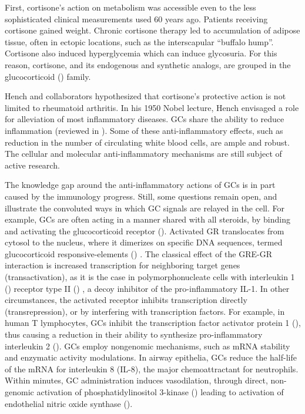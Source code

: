 \documentclass[12pt,english]{report}\usepackage[]{graphicx}\usepackage[]{color}
\begin{document}
First, cortisone's action on metabolism was accessible even to the
less sophisticated clinical measurements used 60 years ago. Patients
receiving cortisone gained weight. Chronic cortisone therapy led to
accumulation of adipose tissue, often in ectopic locations, such as
the interscapular ``buffalo hump''. Cortisone also induced hyperglycemia
which can induce glycosuria. For this reason, cortisone, and its endogenous
and synthetic analogs, are grouped in the glucocorticoid ()
family.

Hench and collaborators hypothesized that cortisone's protective action
is not limited to rheumatoid arthritis. In his 1950 Nobel lecture,
Hench envisaged a role for alleviation of most inflammatory diseases.
GCs share the ability to reduce inflammation (reviewed in \citep{clark2007anti-inflammatory,coutinho2011anti-inflammatory}).
Some of these anti-inflammatory effects, such as reduction in the
number of circulating white blood cells, are ample and robust. The
cellular and molecular anti-inflammatory mechanisms are still subject
of active research.

The knowledge gap around the anti-inflammatory actions of GCs is in
part caused by the immunology progress. Still, some questions remain
open, and illustrate the convoluted ways in which GC signals are relayed
in the cell. For example, GCs are often acting in a manner shared
with all steroids, by binding and activating the glucocorticoid receptor
(). Activated GR translocates
from cytosol to the nucleus, where it dimerizes on specific DNA sequences,
termed glucocorticoid responsive-elements ()
\citep{truss1990contacts}. The classical effect of the GRE-GR interaction
is increased transcription for neighboring target genes (transactivation),
as it is the case in polymorphonucleate cells with interleukin 1 ()
receptor type II ()
\citep{re1994type}, a decoy inhibitor of the pro-inflammatory IL-1.
In other circumstances, the activated receptor inhibits transcription
directly (transrepression), or by interfering with transcription factors.
For example, in human T lymphocytes, GCs inhibit the transcription
factor activator protein 1 (),
thus causing a reduction in their ability to synthesize pro-inflammatory
interleukin 2 ()\citep{paliogianni1993negative}.
GCs employ nongenomic mechanisms, such as mRNA stability and enzymatic
activity modulations. In airway epithelia, GCs reduce the half-life
of the mRNA for interleukin 8 (IL-8), the major chemoattractant for
neutrophils\citep{chang2001mechanism}. Within minutes, GC administration
induces vasodilation, through direct, non-genomic activation of phosphatidylinositol
3-kinase () leading
to activation of endothelial nitric oxide synthase ()\citep{hafezi-moghadam2002acute}.
\end{document}
